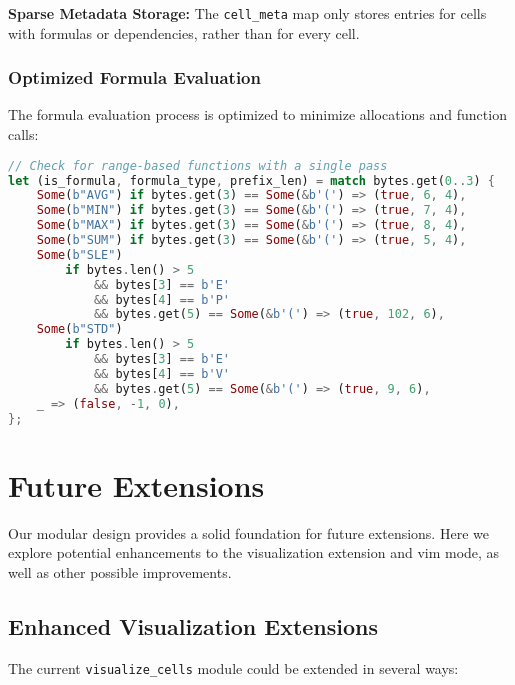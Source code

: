 \documentclass[11pt,a4paper]{article}
\begin{document}
 \textbf{Sparse Metadata Storage:} The \lstinline{cell_meta} map only stores entries for cells with formulas or dependencies, rather than for every cell.


\subsubsection{Optimized Formula Evaluation}

The formula evaluation process is optimized to minimize allocations and function calls:

\begin{lstlisting}[language=Rust, caption={Optimized formula detection}, label=lst:formula-detection]
// Check for range-based functions with a single pass
let (is_formula, formula_type, prefix_len) = match bytes.get(0..3) {
    Some(b"AVG") if bytes.get(3) == Some(&b'(') => (true, 6, 4),
    Some(b"MIN") if bytes.get(3) == Some(&b'(') => (true, 7, 4),
    Some(b"MAX") if bytes.get(3) == Some(&b'(') => (true, 8, 4),
    Some(b"SUM") if bytes.get(3) == Some(&b'(') => (true, 5, 4),
    Some(b"SLE")
        if bytes.len() > 5
            && bytes[3] == b'E'
            && bytes[4] == b'P'
            && bytes.get(5) == Some(&b'(') => (true, 102, 6),
    Some(b"STD")
        if bytes.len() > 5
            && bytes[3] == b'E'
            && bytes[4] == b'V'
            && bytes.get(5) == Some(&b'(') => (true, 9, 6),
    _ => (false, -1, 0),
};
\end{lstlisting}

\section{Future Extensions}
\label{sec:extensions}

Our modular design provides a solid foundation for future extensions. Here we explore potential enhancements to the visualization extension and vim mode, as well as other possible improvements.

\subsection{Enhanced Visualization Extensions}

The current \lstinline{visualize_cells} module could be extended in several ways:
\end{document}
